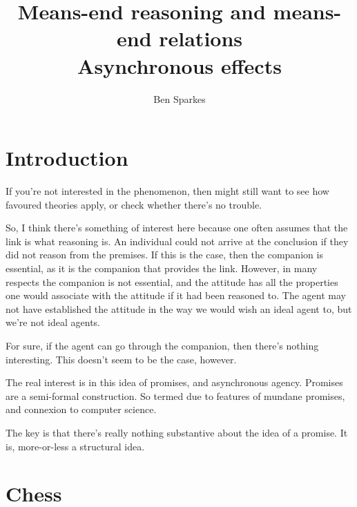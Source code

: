 \documentclass[10pt]{article}
\title{Means-end reasoning and means-end relations \\ Asynchronous effects}
\author{Ben Sparkes}
\begin{document}
\section{Introduction}
\label{sec:introduction}

If you're not interested in the phenomenon, then might still want to see how favoured theories apply, or check whether there's no trouble.


So, I think there's something of interest here because one often assumes that the link is what reasoning is.
An individual could not arrive at the conclusion if they did not reason from the premises.
If this is the case, then the companion is essential, as it is the companion that provides the link.
However, in many respects the companion is not essential, and the attitude has all the properties one would associate with the attitude if it had been reasoned to.
The agent may not have established the attitude in the way we would wish an ideal agent to, but we're not ideal agents.

For sure, if the agent can go through the companion, then there's nothing interesting.
This doesn't seem to be the case, however.

The real interest is in this idea of promises, and asynchronous agency.
Promises are a semi-formal construction.
So termed due to features of mundane promises, and connexion to computer science.

The key is that there's really nothing substantive about the idea of a promise.
It is, more-or-less a structural idea.

\section{Chess}
\label{sec:chess}
\end{document}
